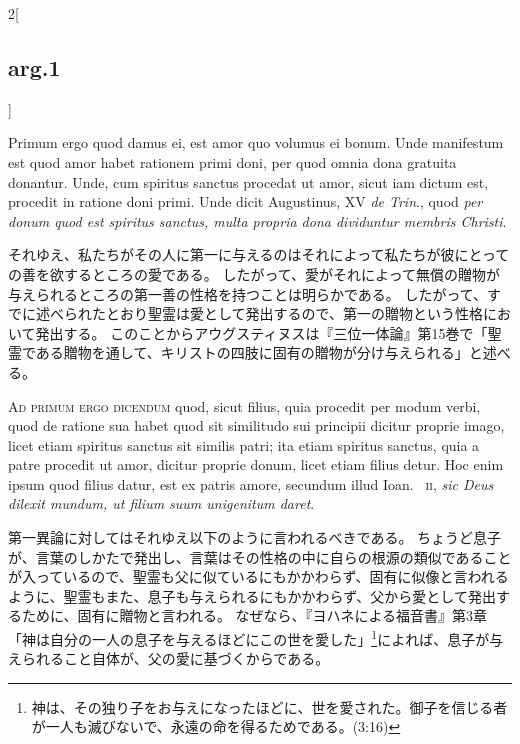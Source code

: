 \documentclass[paper=a4paper,fontsize=10pt,jafontsize=9pt,titlepage]{jlreq}
\begin{document}
\begin{paracol}{2}[\subsection{arg.1}]
\switchcolumn*

Primum ergo quod damus ei, est amor quo volumus ei
bonum. Unde manifestum est quod amor habet rationem primi doni, per quod omnia
dona gratuita donantur. Unde, cum spiritus sanctus procedat ut amor, sicut iam
dictum est, procedit in ratione doni primi. Unde dicit Augustinus, XV \textit{de Trin}.,
quod \textit{per donum quod est spiritus sanctus, multa propria dona dividuntur membris
Christi}.

\switchcolumn

それゆえ、私たちがその人に第一に与えるのはそれによって私たちが彼にとっての善を欲するところの愛である。
したがって、愛がそれによって無償の贈物が与えられるところの第一善の性格を持つことは明らかである。
したがって、すでに述べられたとおり聖霊は愛として発出するので、第一の贈物という性格において発出する。
このことからアウグスティヌスは『三位一体論』第15巻で「聖霊である贈物を通して、キリストの四肢に固有の贈物が分け与えられる」と述べる。

\switchcolumn*[\subsection{ad.1}]

\textsc{Ad primum ergo dicendum} quod, sicut filius, quia procedit per modum verbi, quod
de ratione sua habet quod sit similitudo sui principii dicitur proprie imago,
licet etiam spiritus sanctus sit similis patri; ita etiam spiritus sanctus,
quia a patre procedit ut amor, dicitur proprie donum, licet etiam filius detur.
Hoc enim ipsum quod filius datur, est ex patris amore, secundum illud Ioan.~
\textsc{ii}, \textit{sic Deus dilexit mundum, ut filium suum unigenitum daret}.

\switchcolumn

第一異論に対してはそれゆえ以下のように言われるべきである。
ちょうど息子が、言葉のしかたで発出し、言葉はその性格の中に自らの根源の類似であることが入っているので、聖霊も父に似ているにもかかわらず、固有に似像と言われるように、聖霊もまた、息子も与えられるにもかかわらず、父から愛として発出するために、固有に贈物と言われる。
なぜなら、『ヨハネによる福音書』第3章「神は自分の一人の息子を与えるほどにこの世を愛した」\footnote{神は、その独り子をお与えになったほどに、世を愛された。御子を信じる者が一人も滅びないで、永遠の命を得るためである。(3:16)}によれば、息子が与えられること自体が、父の愛に基づくからである。

\switchcolumn*[\subsection{ad.2}]


\end{paracol}
\end{document}
